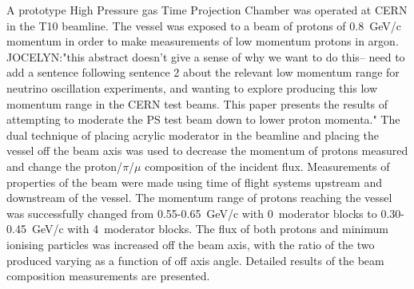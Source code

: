 A prototype High Pressure gas Time Projection Chamber was operated at CERN in the T10 beamline. The vessel was exposed to a beam of protons of 0.8~GeV/c momentum in order to make measurements of low momentum protons in argon. JOCELYN:"this abstract doesn't give a sense of why we want to do this-- need to add a sentence following sentence 2 about the relevant low momentum range for neutrino oscillation experiments, and wanting to explore producing this low momentum range in the CERN test beams.  This paper presents the results of attempting to moderate the PS test beam down to lower proton momenta." The dual technique of placing acrylic moderator in the beamline and placing the vessel off the beam axis was used to decrease the momentum of protons measured and change the proton/$\pi$/$\mu$ composition of the incident flux. Measurements of properties of the beam were made using time of flight systems upstream and downstream of the vessel. The momentum range of protons reaching the vessel was successfully changed from 0.55-0.65~GeV/c with 0~moderator blocks to 0.30-0.45~GeV/c with 4~moderator blocks. The flux of both protons and minimum ionising particles was increased off the beam axis, with the ratio of the two produced varying as a function of off axis angle. Detailed results of the beam composition measurements are presented.

